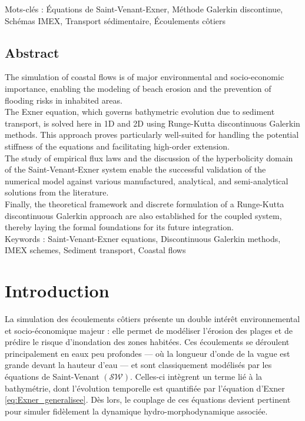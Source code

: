 \documentclass[11pt, a4paper, oneside]{report}
\begin{document}
\noindent
Mots-clés : Équations de Saint-Venant-Exner, Méthode Galerkin discontinue, Schémas IMEX, Transport sédimentaire, Écoulements côtiers

\section*{Abstract}

The simulation of coastal flows is of major environmental and socio-economic importance, enabling the modeling of beach erosion and the prevention of flooding risks in inhabited areas. \\
The Exner equation, which governs bathymetric evolution due to sediment transport, is solved here in 1D and 2D using Runge-Kutta discontinuous Galerkin methods. This approach proves particularly well-suited for handling the potential stiffness of the equations and facilitating high-order extension. \\
The study of empirical flux laws and the discussion of the hyperbolicity domain of the Saint-Venant-Exner system enable the successful validation of the numerical model against various manufactured, analytical, and semi-analytical solutions from the literature. \\
Finally, the theoretical framework and discrete formulation of a Runge-Kutta discontinuous Galerkin approach are also established for the coupled system, thereby laying the formal foundations for its future integration. \\

\noindent
Keywords : Saint-Venant-Exner equations, Discontinuous Galerkin methods, IMEX schemes, Sediment transport, Coastal flows

\tableofcontents
\thispagestyle{empty}

\chapter*{Introduction}
\setcounter{page}{1}

La simulation des écoulements côtiers présente un double intérêt environnemental et socio-économique majeur : elle permet de modéliser l'érosion des plages et de prédire le risque d'inondation des zones habitées.
Ces écoulements se déroulent principalement en eaux peu profondes — où la longueur d'onde de la vague est grande devant la hauteur d'eau — et sont classiquement modélisés par les équations de Saint-Venant $(\mathcal{SW})$. Celles-ci intègrent un terme lié à la bathymétrie, dont l'évolution temporelle est quantifiée par l'équation d'Exner \eqref{eq:Exner_generalisee}. Dès lors, le couplage de ces équations devient pertinent pour simuler fidèlement la dynamique hydro-morphodynamique associée. \\
\end{document}
